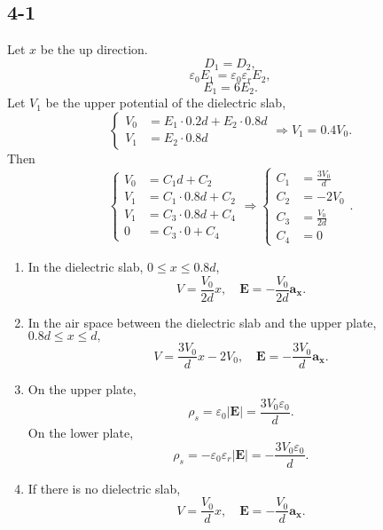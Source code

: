 \documentclass[6pt,a4paper]{article}
\begin{document}
\subsection{4-1}
Let $x$ be the up direction. 
$$D_1=D_2,$$
$$\varepsilon_0E_1=\varepsilon_0\varepsilon_rE_2,$$
$$E_1=6E_2.$$
Let $V_1$ be the upper potential of the dielectric slab,$$\left\{\begin{aligned}V_0&=E_1\cdot0.2d+E_2\cdot0.8d\\V_1&=E_2\cdot 0.8d\end{aligned}\right.\Longrightarrow V_1=0.4V_0.$$
Then
$$\left\{\begin{aligned}V_0&=C_1d+C_2\\V_1&=C_1\cdot 0.8d+C_2\\V_1&=C_3\cdot 0.8d + C_4\\0&=C_3\cdot 0+C_4\end{aligned}\right.\Longrightarrow\left\{\begin{aligned}C_1&=\frac{3V_0}{d}\\C_2&=-2V_0\\C_3&=\frac{V_0}{2d}\\C_4&=0\end{aligned}\right..$$
\begin{enumerate}[label=\alph*)]
\item
In the dielectric slab, $0\leqslant x\leqslant 0.8d$,
$$V=\frac{V_0}{2d}x,\quad\mathbf{E}=-\frac{V_0}{2d}\mathbf{a_x}.$$
\item
In the air space between the dielectric slab and the upper plate, $0.8d\leqslant x\leqslant d,$
$$V=\frac{3V_0}{d}x-2V_0,\quad\mathbf{E}=-\frac{3V_0}{d}\mathbf{a_x}.$$
\item
On the upper plate,
$$\rho_s=\varepsilon_0|\mathbf{E}|=\frac{3V_0\varepsilon_0}{d}.$$
On the lower plate,
$$\rho_s=-\varepsilon_0\varepsilon_r|\mathbf{E}|=-\frac{3V_0\varepsilon_0}{d}.$$
\item
If there is no dielectric slab,
$$V=\frac{V_0}{d}x,\quad \mathbf{E}=-\frac{V_0}{d}\mathbf{a_x}.$$ 
\end{enumerate}
\end{document}
